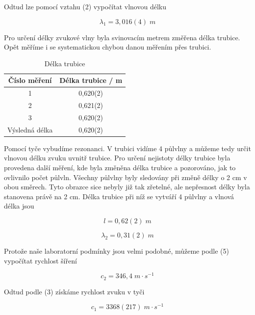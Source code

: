 Odtud lze pomocí vztahu (2) vypočítat vlnovou délku

\begin{equation}
    \nonumber
    \lambda_1 = 3,016(4) \; m
\end{equation}

Pro určení délky zvukové vlny byla svinovacím metrem změřena délka trubice. Opět měříme i se systematickou chybou danou měřením přes trubici.

\begin{table}[h]
\centering
\caption{Délka trubice}
\label{tab:delka-trubice}
\begin{tabular}{|c|c|} 
\hline
Číslo měření   & Délka trubice / m  \\ 
\hline
1              & 0,620(2)          \\
2              & 0,621(2)          \\
3              & 0,620(2)          \\ 
\hline
Výsledná délka & 0,620(2)          \\
\hline
\end{tabular}
\end{table}

Pomocí tyče vybudíme rezonanci. V trubici vidíme 4 půlvlny a můžeme tedy určit vlnovou délku zvuku uvnitř trubice.
Pro určení nejistoty délky trubice byla provedena další měření, kde byla změněna délka trubice a pozorováno, jak to ovlivnilo počet půlvln. Všechny půlvlny byly sledovány při změně délky o 2 cm v obou směrech. Tyto obrazce sice nebyly již tak zřetelné, ale nepřesnost délky byla stanovena právě na 2 cm. Délka trubice při níž se vytváří 4 půlvlny a vlnová délka jsou

\begin{equation}
    \nonumber
    l = 0,62(2) \; m
\end{equation}

\begin{equation}
    \nonumber
    \lambda_2 = 0,31(2) \; m
\end{equation}

Protože naše laboratorní podmínky jsou velmi podobné, můžeme podle (5) vypočítat rychlost šíření

\begin{equation}
    \nonumber
    c_2 = 346,4 \; m \cdot s^{-1}
\end{equation}

Odtud podle (3) získáme rychlost zvuku v tyči

\begin{equation}
    \nonumber
    c_1 = 3368(217) \; m \cdot s^{-1}
\end{equation}

